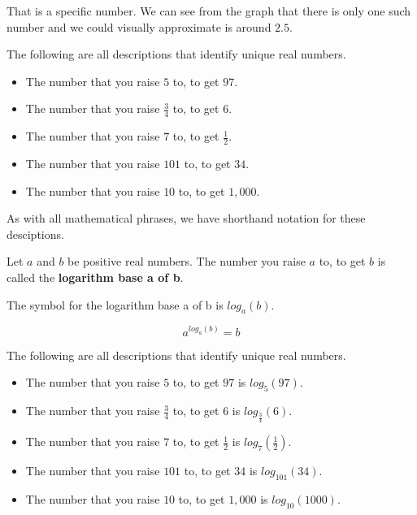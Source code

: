 \documentclass{ximera}
\begin{document}
That is a specific number. We can see from the graph that there is only one such number and we could visually approximate is around $2.5$.


\begin{example}
The following are all descriptions that identify unique real numbers.

\begin{itemize}
\item The number that you raise $5$ to, to get $97$.
\item The number that you raise $\frac{3}{4}$ to, to get $6$.
\item The number that you raise $7$ to, to get $\frac{1}{2}$.
\item The number that you raise $101$ to, to get $34$.
\item The number that you raise $10$ to, to get $1,000$.
\end{itemize}

\end{example}



As with all mathematical phrases, we have shorthand notation for these desciptions.








\begin{definition}

Let $a$ and $b$ be positive real numbers.  The number  you raise $a$ to, to get $b$ is called the \textbf{logarithm base a of b}.

The symbol for the logarithm base a of b is $log_a(b)$.



\[     a^{log_a(b)} = b          \]




\end{definition}





\begin{example}
The following are all descriptions that identify unique real numbers.

\begin{itemize}
\item The number that you raise $5$ to, to get $97$ is $log_5(97)$.
\item The number that you raise $\frac{3}{4}$ to, to get $6$ is $log_{\tfrac{3}{4}}(6)$.
\item The number that you raise $7$ to, to get $\frac{1}{2}$ is $log_7\left(\frac{1}{2}\right)$.
\item The number that you raise $101$ to, to get $34$ is $log_{101}(34)$.
\item The number that you raise $10$ to, to get $1,000$ is $log_{10}(1000)$.
\end{itemize}

\end{example}
\end{document}
